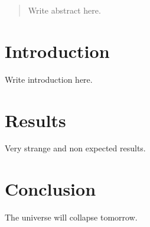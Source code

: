 \documentclass{article}
\begin{document}
\begin{abstract}
Write abstract here.
\end{abstract}

\section{Introduction}

Write introduction here.

\section{Results}

Very strange and non expected results.  

\section{Conclusion}

The universe will collapse tomorrow.
\end{document}
